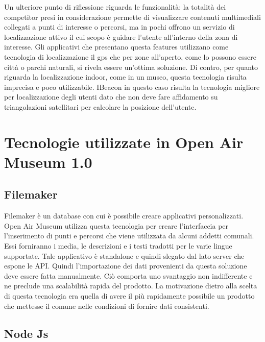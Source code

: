 Un ulteriore punto di riflessione riguarda le funzionalità: la totalità dei competitor presi in considerazione permette di visualizzare contenuti multimediali collegati a punti di interesse o percorsi, ma in pochi offrono un servizio di localizzazione attivo il cui scopo è guidare l'utente all’interno della zona di interesse. Gli applicativi che presentano questa features utilizzano come tecnologia di localizzazione il gps che per zone all’aperto, come lo possono essere città o parchi naturali, si rivela essere un'ottima soluzione. Di contro, per quanto riguarda la localizzazione indoor, come in un museo, questa tecnologia risulta imprecisa e poco utilizzabile. IBeacon in questo caso risulta la tecnologia migliore per localizzazione degli utenti dato che non deve fare affidamento su triangolazioni satellitari per calcolare la posizione dell'utente.\vspace{5mm}

\section{Tecnologie utilizzate in Open Air Museum 1.0}\vspace{5mm}

\subsection{Filemaker}\vspace{3mm}

Filemaker è un database con cui è possibile creare applicativi personalizzati. Open Air Museum utilizza questa tecnologia per creare l’interfaccia per l'inserimento di punti e percorsi che viene utilizzata da alcuni addetti comunali. Essi forniranno i media, le descrizioni e i testi tradotti per le varie lingue supportate. Tale applicativo è standalone e quindi slegato dal lato server che espone le API. Quindi l’importazione dei dati provenienti da questa soluzione deve essere fatta manualmente. Ciò comporta uno svantaggio non indifferente e ne preclude una scalabilità rapida del prodotto. La motivazione dietro alla scelta di questa tecnologia era quella di avere il più rapidamente possibile un prodotto che mettesse il comune nelle condizioni di fornire dati consistenti.\vspace{5mm}

\subsection{Node Js}\vspace{5mm}

